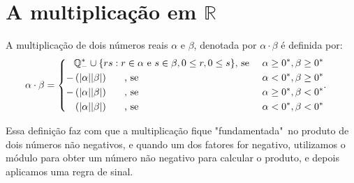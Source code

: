 \documentclass[../main.tex]{subfiles}
\begin{document}
\section{A multiplicação em $\mathbb{R}$}
\begin{defi}\label{reais-def-produto}
    A multiplicação de dois números reais $\alpha$ e $\beta$, denotada por $\alpha \cdot \beta$ é definida por:
    \begin{equation*}
         \alpha \cdot \beta = 
        \begin{cases}
        \begin{aligned}
            & \mathbb{Q}^*_{-} \cup \{ rs : r \in \alpha \text{ e } s \in \beta, 0 \leq r, 0 \leq s \} \text{, se } & \alpha \geq 0^*, \beta \geq 0^*  \\
            - & \left(\abs{\alpha}\abs{\beta}\right) \hspace{0.6cm} \text{, se } & \alpha < 0^*, \beta \geq 0^* \\
            - & \left(\abs{\alpha}\abs{\beta}\right) \hspace{0.6cm} \text{, se } & \alpha \geq 0^*, \beta < 0^* \\
              & \left(\abs{\alpha}\abs{\beta}\right) \hspace{0.6cm} \text{, se } & \alpha < 0^*, \beta < 0^*
        \end{aligned}.
        \end{cases}
    \end{equation*}
\end{defi}
Essa definição faz com que a multiplicação fique "fundamentada"\ no produto de dois números não negativos, e quando um dos fatores for negativo, utilizamos o módulo para obter um número não negativo para calcular o produto, e depois aplicamos uma regra de sinal.
\end{document}
